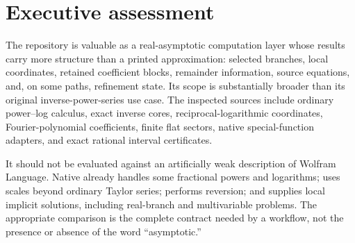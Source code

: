 \documentclass[11pt,letterpaper]{article}
\newcommand{\code}[1]{\texttt{\detokenize{#1}}}
\begin{document}
\begin{abstract}
This audit reviews a pinned revision of the Asymptotic repository while treating
its nine existing code reviews as an exclusion baseline. It contributes four
specific deltas. First, the previously recognized ambient-assumption problem
is sharpened to a native reproduction of an incorrect source-domain certificate
for an already constructed object. Second, the flat-sector product algorithm
prematurely erases exponential degrees: increasing one operand's sector depth
can worsen the algebraic factor in the reported tail. A boundary-sensitive
replacement is proved and tested. Third, a native numerical inverse check is
shown to return an inexact zero ratio with roughly minus 800 digits of accuracy;
this is not an exact-zero error, but it needs an explicit resolution status.
A normalized correction equation resolves the example without subtracting
nearly equal source roots. Fourth, native Wolfram 15 already supplies the first
three Dirichlet terms of the zeta function, contrary to an overbroad source
comment. The package's genuine additional value in that example is its explicit
coordinate and quantitative tail bounds. The report develops a concrete
fixed-order derivative bound for those tails, compares the broader architecture
with native capabilities, and supplies narrow patches, reproductions, test
specifications, and independent mathematical checks.
\end{abstract}
\tableofcontents
\newpage

\section{Executive assessment}
\label{sec:executive}
The repository is valuable as a real-asymptotic computation layer whose results
carry more structure than a printed approximation: selected branches,
local coordinates, retained coefficient blocks, remainder information,
source equations, and, on some paths, refinement state. Its scope is substantially
broader than its original inverse-power-series use case. The inspected sources
include ordinary power--log calculus, exact inverse cores, reciprocal-logarithmic
coordinates, Fourier-polynomial coefficients, finite flat sectors, native
special-function adapters, and exact rational interval certificates.
\cite{readme,seriesops,coordinates,fourier,flat,certificates}

It should not be evaluated against an artificially weak description of Wolfram
Language. Native \code{Series} already handles some fractional powers and
logarithms; \code{Asymptotic} uses scales beyond ordinary Taylor series;
\code{InverseSeries} performs reversion; and \code{AsymptoticSolve} supplies
local implicit solutions, including real-branch and multivariable problems.
The appropriate comparison is the complete contract needed by a workflow,
not the presence or absence of the word ``asymptotic.''\cite{wlseries,wlasymptotic,wlinverse,wlsolve}
\end{document}
